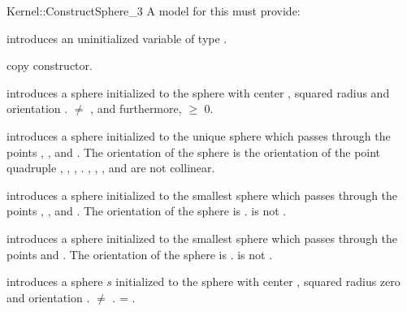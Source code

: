 \begin{ccRefFunctionObjectConcept}{Kernel::ConstructSphere_3}
A model for this must provide:


\ccHidden
{}
       {introduces an uninitialized variable of type \ccRefName.}

\ccHidden
{}
        {copy constructor.}

        {introduces a sphere initialized to the sphere with center ,
        squared radius  and orientation
        .
        \ccPrecond {} $\neq$ , and furthermore,
                    $\geq$ 0.}

	{introduces a sphere initialized to the unique sphere which passes
	through the points , ,  and . The
	orientation of the sphere is the orientation of the point quadruple
	, , , .
        \ccPrecond {}, , , and  are not collinear.}


      {introduces a sphere initialized to the smallest sphere which passes
      through the points , , and . The orientation of
        the sphere is . \ccPrecond {} is not
        .}

	{introduces a sphere initialized to the smallest sphere which passes
	through the points  and . The orientation of
        the sphere is . \ccPrecond {} is not
        .}


      {introduces a sphere $s$ initialized to the sphere with center 
        , squared radius zero and orientation .
        \ccPrecond {} $\neq$ .
        \ccPostcond {} = .}

\ccSeeAlso
{}\\
\end{ccRefFunctionObjectConcept}
